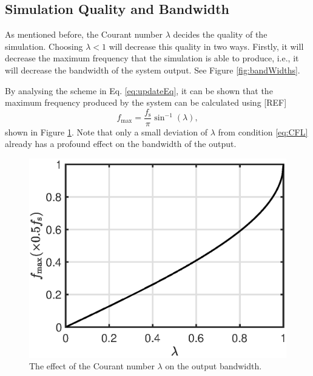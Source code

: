 \documentclass[dvipsnames, preprint]{JASA}
\begin{document}
\subsection{Simulation Quality and Bandwidth}\label{sec:quality}
As mentioned before, the Courant number $\lambda$ decides the quality of the simulation. Choosing $\lambda < 1$ will decrease this quality in two ways. Firstly, it will decrease the maximum frequency that the simulation is able to produce, i.e., it will decrease the bandwidth of the system output. See Figure \ref{fig:bandWidths}.
%
\begin{figure}
\end{figure}
%
By analysing the scheme in Eq. \eqref{eq:updateEq}, it can be shown that the maximum frequency produced by the system can be calculated using [REF]
\begin{equation}
    f_\text{max} = \frac{f_\text{s}}{\pi} \sin^{-1}(\lambda),
\end{equation}
shown in Figure \ref{fig:bandWidthFormula}.
%
Note that only a small deviation of $\lambda$ from condition \eqref{eq:CFL} already has a profound effect on the bandwidth of the output.

\begin{figure}
\includegraphics[width=\reprintcolumnwidth]{bandwidthPlot}
\caption{\label{fig:bandWidthFormula}{The effect of the Courant number $\lambda$ on the output bandwidth.}}
\end{figure} 
\end{document}
